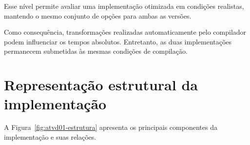 Esse nível permite avaliar uma implementação otimizada em condições
realistas, mantendo o mesmo conjunto de opções para ambas as versões.

Como consequência, transformações realizadas automaticamente pelo
compilador podem influenciar os tempos absolutos. Entretanto, as duas
implementações permanecem submetidas às mesmas condições de compilação.



\section{Representação estrutural da implementação}

\label{sec:atvd01-estrutura}

A Figura~\ref{fig:atvd01-estrutura} apresenta os principais componentes
da implementação e suas relações.


